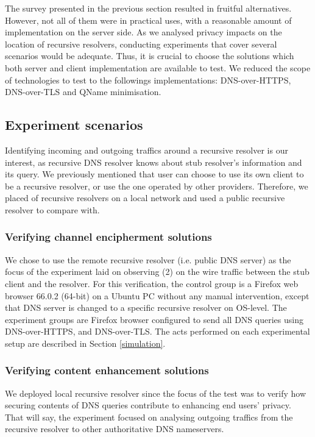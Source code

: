 \documentclass[a4paper,12pt]{article}
\begin{document}
The survey presented in the previous section resulted in fruitful alternatives.
However, not all of them were in practical uses, with a reasonable amount of implementation on the server side.
As we analysed privacy impacts on the location of recursive resolvers, conducting experiments that cover several scenarios would be adequate. Thus, it is crucial to choose the solutions which both server and client implementation are available to test.
We reduced the scope of technologies to test to the followings implementations: DNS-over-HTTPS\cite{rfc8484}, DNS-over-TLS\cite{hu2016specification} and QName minimisation\cite{bortzmeyer2016dns}.

\subsection{Experiment scenarios}
Identifying incoming and outgoing traffics around a recursive resolver is our interest, as recursive DNS resolver knows about stub resolver's information and its query.
We previously mentioned that user can choose to use its own client to be a recursive resolver, or use the one operated by other providers. Therefore, we placed of recursive resolvers on a local network and used a public recursive resolver to compare with.

\subsubsection{Verifying channel encipherment solutions}
We chose to use the remote recursive resolver (i.e. public DNS server) as the focus of the experiment laid on observing (2) on the wire traffic between the stub client and the resolver.
For this verification, the control group is a Firefox web browser 66.0.2 (64-bit) on a Ubuntu PC without any manual intervention, except that DNS server is changed to a specific recursive resolver on OS-level. The experiment groups are Firefox browser configured to send all DNS queries using DNS-over-HTTPS, and DNS-over-TLS. The acts performed on each experimental setup are described in Section \ref{simulation}.

\subsubsection{Verifying content enhancement solutions}
We deployed local recursive resolver since the focus of the test was to verify how securing contents of DNS queries contribute to enhancing end users' privacy. That will say, the experiment focused on analysing outgoing traffics from the recursive resolver to other authoritative DNS nameservers. 
\end{document}
